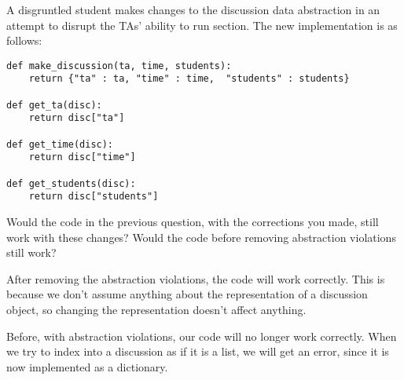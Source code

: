\question
A disgruntled student makes changes to the discussion 
data abstraction in an attempt to disrupt the TAs' ability
to run section. The new implementation is as follows:

\begin{lstlisting}
def make_discussion(ta, time, students):
    return {"ta" : ta, "time" : time,  "students" : students}

def get_ta(disc):
    return disc["ta"]

def get_time(disc):
    return disc["time"]

def get_students(disc):
    return disc["students"]
\end{lstlisting}

Would the code in the previous question, with the corrections
you made, still work with these changes? Would the code before
removing abstraction violations still work?

\begin{solution}
After removing the abstraction violations, the code will work 
correctly. This is because we don't assume anything about the
representation of a discussion object, so changing the 
representation doesn't affect anything.

Before, with abstraction violations, our code will no longer work 
correctly. When we try to index into a discussion as if it is a 
list, we will get an error, since it is now implemented as a 
dictionary.
\end{solution}
